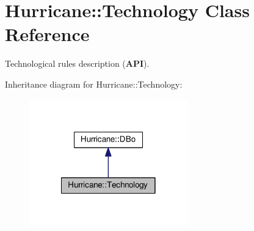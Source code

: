 \hypertarget{classHurricane_1_1Technology}{\section{Hurricane\-:\-:Technology Class Reference}
\label{classHurricane_1_1Technology}
}


Technological rules description ({\bfseries A\-P\-I}).  




Inheritance diagram for Hurricane\-:\-:Technology\-:\nopagebreak
\begin{figure}[H]
\begin{center}
\leavevmode
\includegraphics[width=194pt]{classHurricane_1_1Technology__inherit__graph}
\end{center}
\end{figure}
